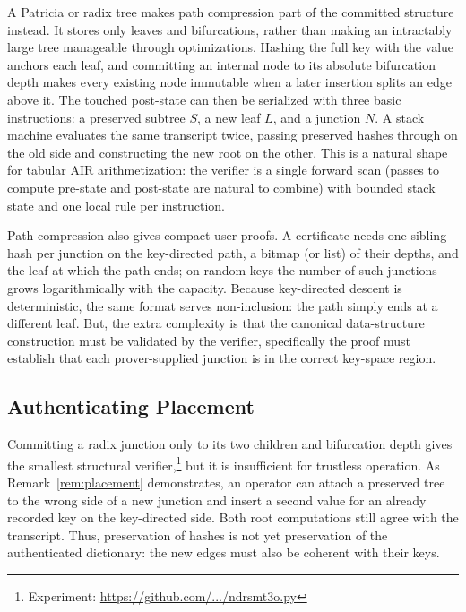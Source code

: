 \documentclass[11pt]{article}
\begin{document}
A Patricia or radix tree makes path compression part of the committed structure instead. It stores only leaves and bifurcations, rather than making an intractably large tree manageable through optimizations. Hashing the full key with the value anchors each leaf, and committing an internal node to its absolute bifurcation depth makes every existing node immutable when a later insertion splits an edge above it. The touched post-state can then be serialized with three basic instructions: a preserved subtree \(S\), a new leaf \(L\), and a junction \(N\). A stack machine evaluates the same transcript twice, passing preserved hashes through on the old side and constructing the new root on the other. This is a natural shape for tabular AIR arithmetization: the verifier is a single forward scan (passes to compute pre-state and post-state are natural to combine) with bounded stack state and one local rule per instruction.

Path compression also gives compact user proofs. A certificate needs one sibling hash per junction on the key-directed path, a bitmap (or list) of their depths, and the leaf at which the path ends; on random keys the number of such junctions grows logarithmically with the capacity. Because key-directed descent is deterministic, the same format serves non-inclusion: the path simply ends at a different leaf. But, the extra complexity is that the canonical data-structure construction must be validated by the verifier, specifically the proof must establish that each prover-supplied junction is in the correct key-space region.

\subsection{Authenticating Placement}

Committing a radix junction only to its two children and bifurcation depth gives the smallest structural verifier,\footnote{Experiment: \href{https://github.com/ristik/ndsmt-experiments/blob/main/ndrsmt3o.py}{https://github.com/.../ndrsmt3o.py}} but it is insufficient for trustless operation. As Remark~\ref{rem:placement} demonstrates, an operator can attach a preserved tree to the wrong side of a new junction and insert a second value for an already recorded key on the key-directed side. Both root computations still agree with the transcript. Thus, preservation of hashes is not yet preservation of the authenticated dictionary: the new edges must also be coherent with their keys.
\end{document}
